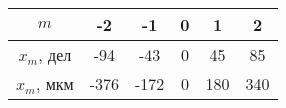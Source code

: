 \begin{tabular}{|c|c|c|c|c|c|}
\hline
$m$&-2&-1&0&1&2\\
\hline
$x_m$, дел&-94&-43&0&45&85\\
\hline
$x_m$, мкм&-376&-172&0&180&340\\
\hline
\end{tabular}